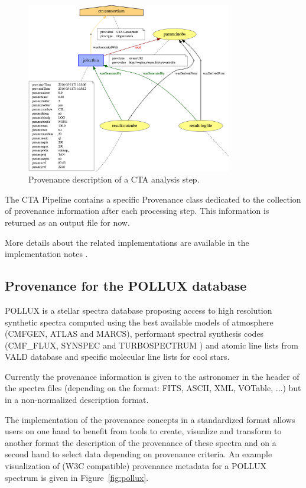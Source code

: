 \begin{figure}
\centering
\includegraphics[width=0.8\textwidth]{CTA_prov.png}
\caption[Provenance description of a CTA analysis step]{Provenance description of a CTA analysis step.}
\label{fig:cta_prov}
\end{figure}

The CTA Pipeline contains a specific Provenance class dedicated to the collection of provenance information after each processing step. This information is returned as an output file for now.

More details about the related implementations are available in the implementation notes \citep{std:ProvenanceImplementationNote}.


\subsection{Provenance for the POLLUX database}

POLLUX is a stellar spectra database proposing access to high resolution synthetic spectra computed using the best available models of atmosphere (CMFGEN, ATLAS and MARCS), performant spectral synthesis codes (CMF\_FLUX, SYNSPEC and TURBOSPECTRUM ) and atomic line lists from VALD database and specific molecular line lists for cool stars. 

Currently the provenance information is given to the astronomer in the header of the spectra files (depending on the format: FITS, ASCII, XML, VOTable, ...) but in a non-normalized description format. 

The implementation of the provenance concepts in a standardized format allows users on one hand to benefit from tools to create, visualize and transform to another format the description of the provenance of these spectra and on a second hand to select data depending on provenance criteria. An example visualization of (W3C compatible) provenance metadata for a POLLUX spectrum is given in Figure~\ref{fig:pollux}.

